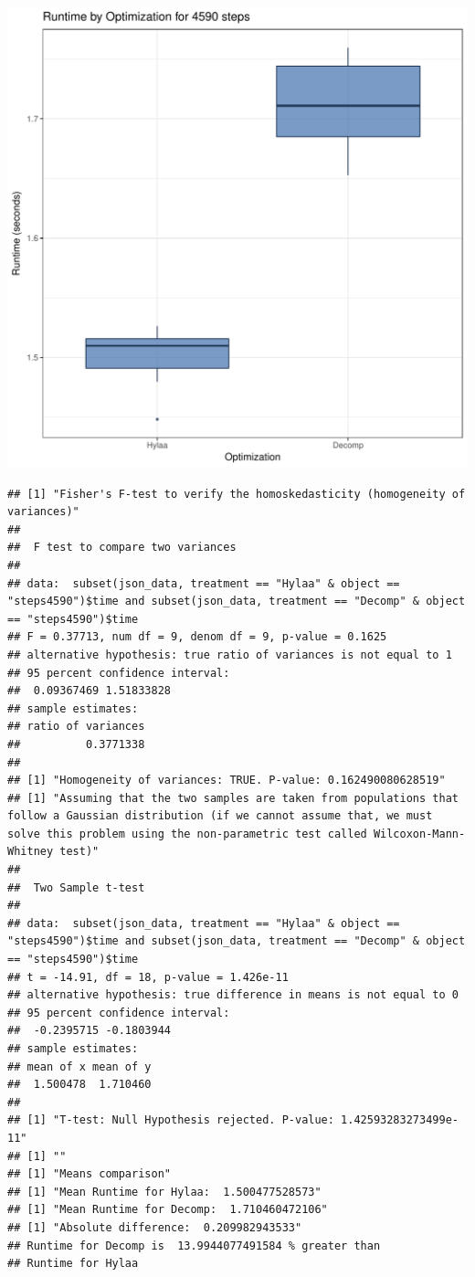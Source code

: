 \documentclass{article}\usepackage[]{graphicx}\usepackage[]{color}
\makeatletter
\def\maxwidth{ %
  \ifdim\Gin@nat@width>\linewidth
    \linewidth
  \else
    \Gin@nat@width
  \fi
}
\newenvironment{kframe}{%
 \def\at@end@of@kframe{}%
 \ifinner\ifhmode%
  \def\at@end@of@kframe{\end{minipage}}%
  \begin{minipage}{\columnwidth}%
 \fi\fi%
 \def\FrameCommand##1{\hskip\@totalleftmargin \hskip-\fboxsep
 \colorbox{shadecolor}{##1}\hskip-\fboxsep
     \hskip-\linewidth \hskip-\@totalleftmargin \hskip\columnwidth}%
 \MakeFramed {\advance\hsize-\width
   \@totalleftmargin\z@ \linewidth\hsize
   \@setminipage}}%
 {\par\unskip\endMakeFramed%
 \at@end@of@kframe}
\newenvironment{knitrout}{}{} %
\makeatother
\begin{document}
\begin{knitrout}
\color{fgcolor}
\includegraphics[width=\maxwidth]{figure/RH2_steps4590-1} 
\begin{kframe}\begin{verbatim}
## [1] "Fisher's F-test to verify the homoskedasticity (homogeneity of variances)"
## 
## 	F test to compare two variances
## 
## data:  subset(json_data, treatment == "Hylaa" & object == "steps4590")$time and subset(json_data, treatment == "Decomp" & object == "steps4590")$time
## F = 0.37713, num df = 9, denom df = 9, p-value = 0.1625
## alternative hypothesis: true ratio of variances is not equal to 1
## 95 percent confidence interval:
##  0.09367469 1.51833828
## sample estimates:
## ratio of variances 
##          0.3771338 
## 
## [1] "Homogeneity of variances: TRUE. P-value: 0.162490080628519"
## [1] "Assuming that the two samples are taken from populations that follow a Gaussian distribution (if we cannot assume that, we must solve this problem using the non-parametric test called Wilcoxon-Mann-Whitney test)"
## 
## 	Two Sample t-test
## 
## data:  subset(json_data, treatment == "Hylaa" & object == "steps4590")$time and subset(json_data, treatment == "Decomp" & object == "steps4590")$time
## t = -14.91, df = 18, p-value = 1.426e-11
## alternative hypothesis: true difference in means is not equal to 0
## 95 percent confidence interval:
##  -0.2395715 -0.1803944
## sample estimates:
## mean of x mean of y 
##  1.500478  1.710460 
## 
## [1] "T-test: Null Hypothesis rejected. P-value: 1.42593283273499e-11"
## [1] ""
## [1] "Means comparison"
## [1] "Mean Runtime for Hylaa:  1.500477528573"
## [1] "Mean Runtime for Decomp:  1.710460472106"
## [1] "Absolute difference:  0.209982943533"
## Runtime for Decomp is  13.9944077491584 % greater than 
## Runtime for Hylaa
\end{verbatim}
\end{kframe}
\end{knitrout}
\end{document}
